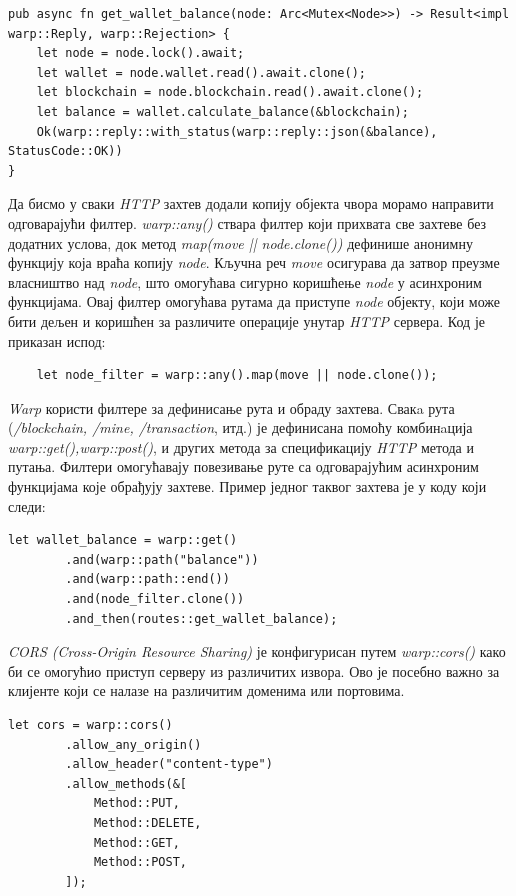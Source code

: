 \documentclass[12pt, a4paper]{article}
\begin{document}
\begin{verbatim}
pub async fn get_wallet_balance(node: Arc<Mutex<Node>>) -> Result<impl warp::Reply, warp::Rejection> {
    let node = node.lock().await;
    let wallet = node.wallet.read().await.clone();
    let blockchain = node.blockchain.read().await.clone();
    let balance = wallet.calculate_balance(&blockchain);
    Ok(warp::reply::with_status(warp::reply::json(&balance), StatusCode::OK))
}
\end{verbatim}

Да бисмо у сваки \textit{HTTP} захтев додали копију објекта чвора морамо направити одговарајући филтер. \textit{warp::any()} ствара филтер који прихвата све захтеве без додатних услова, док метод \textit{map(move || node.clone())} дефинише анонимну функцију која враћа копију \textit{node}. Кључна реч \textit{move} осигурава да затвор преузме власништво над \textit{node}, што омогућава сигурно коришћење \textit{node} у асинхроним функцијама. Овај филтер омогућава рутама да приступе \textit{node} објекту, који може бити дељен и коришћен за различите операције унутар \textit{HTTP} сервера. Код је приказан испод:

\begin{verbatim}
    let node_filter = warp::any().map(move || node.clone());
\end{verbatim}


\textit{Warp} користи филтере за дефинисање рута и обраду захтева. Свакa рута (\textit{/blockchain, /mine, /transaction}, итд.) је дефинисана помоћу комбинaција \textit{warp::get(),\newline warp::post()}, и других метода за спецификацију \textit{HTTP} метода и путања. Филтери омогућавају повезивање руте са одговарајућим асинхроним функцијама које обрађују захтеве. Пример једног таквог захтева је у коду који следи:

\begin{verbatim}
let wallet_balance = warp::get()
        .and(warp::path("balance"))
        .and(warp::path::end())
        .and(node_filter.clone())
        .and_then(routes::get_wallet_balance);
\end{verbatim}


\textit{CORS (Cross-Origin Resource Sharing)} је конфигурисан путем \textit{warp::cors()} како би се омогућио приступ серверу из различитих извора. Ово је посебно важно за клијенте који се налазе на различитим доменима или портовима. 

\begin{verbatim}
let cors = warp::cors()
        .allow_any_origin()
        .allow_header("content-type")
        .allow_methods(&[
            Method::PUT,
            Method::DELETE,
            Method::GET,
            Method::POST,
        ]);

\end{verbatim}
\end{document}
